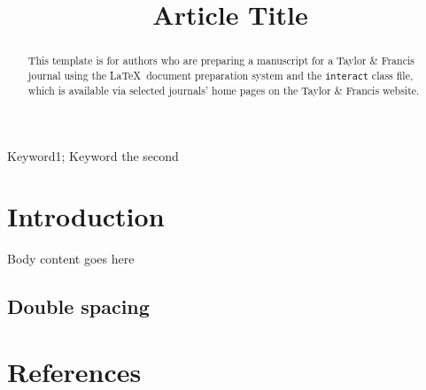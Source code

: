 \documentclass[]{interact}
\theoremstyle{plain}%
\theoremstyle{definition}
\theoremstyle{remark}
\begin{document}

\title{Article Title}

\author{
}

\maketitle

\begin{abstract}
  This template is for authors who are preparing a manuscript for a Taylor
  \& Francis journal using the \LaTeX~document preparation system and the
  \texttt{interact} class file, which is available via selected journals'
  home pages on the Taylor \& Francis website.
\end{abstract}

  \begin{keywords} Keyword1; Keyword the second\end{keywords}


\hypertarget{introduction}{%
\section{Introduction}\label{introduction}}

Body content goes here

\hypertarget{double-spacing}{%
\subsection{Double spacing}\label{double-spacing}}

\hypertarget{references}{%
\section*{References}\label{references}}
\end{document}
